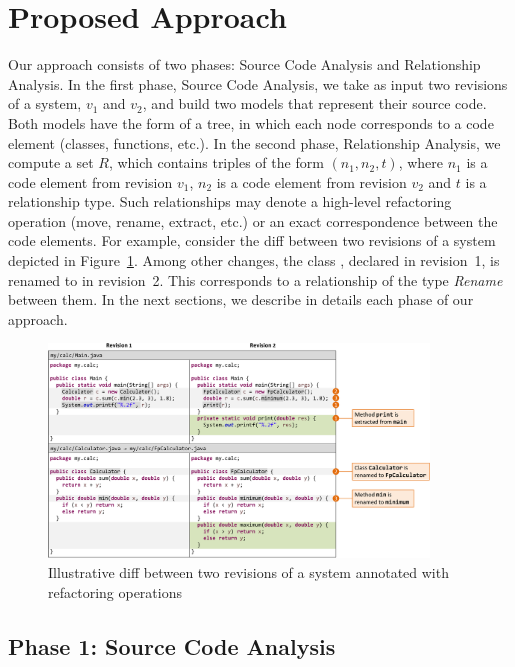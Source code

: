 \section{Proposed Approach}
\label{SecApproach}

Our approach consists of two phases: Source Code Analysis and Relationship Analysis.
In the first phase, Source Code Analysis, we take as input two revisions of a system, $v_1$ and $v_2$, and build two models that represent their source code.
Both models have the form of a tree, in which each node corresponds to a code element (classes, functions, etc.).
In the second phase, Relationship Analysis, we compute a set $R$, which contains triples of the form $(n_1, n_2, t)$, where $n_1$ is a code element from revision $v_1$, $n_2$ is a code element from revision $v_2$ and $t$ is a relationship type.
Such relationships may denote a high-level refactoring operation (move, rename, extract, etc.) or an exact correspondence between the code elements.
For example, consider the diff between two revisions of a system depicted in Figure~\ref{FigDiff1}.
Among other changes, the class , declared in revision~1, is renamed to  in revision~2. This corresponds to a relationship of the type \emph{Rename} between them.
In the next sections, we describe in details each phase of our approach.

\begin{figure}[htb]
\centering
\includegraphics[width=0.9\textwidth]{img-diff1.pdf}
\caption{Illustrative diff between two revisions of a system annotated with refactoring operations}
\label{FigDiff1}
\end{figure}


\subsection{Phase 1: Source Code Analysis}

